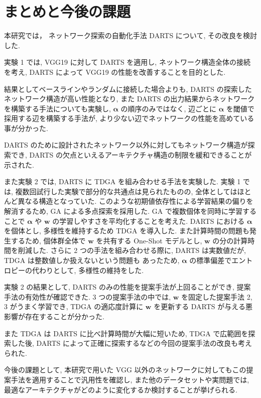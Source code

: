 \newpage
\changeindent{0cm}
\section{まとめと今後の課題}
\label{sec:conclusion}
\changeindent{2cm}

本研究では，
ネットワーク探索の自動化手法 DARTS について, その改良を検討した.

実験 1 では,
VGG19 に対して DARTS を適用し, ネットワーク構造全体の接続を考え,
DARTS によって VGG19 の性能を改善することを目的とした.

結果としてベースラインやランダムに接続した場合よりも,
DARTS の探索したネットワーク構造が高い性能となり,
また DARTS の出力結果からネットワークを構築する手法についても実験し,
$\bm{\alpha}$ の順序のみではなく, 辺ごとに $\bm{\alpha}$ を閾値で採用する辺を構築する手法が,
より少ない辺でネットワークの性能を高めている事が分かった.

DARTS のために設計されたネットワーク以外に対してもネットワーク構造が探索でき,
DARTS の欠点といえるアーキテクチャ構造の制限を緩和できることが示された.

また実験 2 では,
DARTS に TDGA を組み合わせる手法を実験した.
実験 1 では, 複数回試行した実験で部分的な共通点は見られたものの,
全体としてはほとんど異なる構造となっていた.
このような初期値依存性による学習結果の偏りを解消するため,
GA による多点探索を採用した.
GA で複数個体を同時に学習することで $\bm{\alpha}$ や $\bm{w}$ の学習しやすさを平均化することを考えた.
DARTS における $\bm{\alpha}$ を個体とし, 多様性を維持するため TDGA を導入した.
また計算時間の問題も発生するため, 個体群全体で $\bm{w}$ を共有する One-Shot モデルとし,
$\bm{w}$ の分の計算時間を削減した.
さらに 2 つの手法を組み合わせる際に, DARTS は実数値だが, TDGA は整数値しか扱えないという問題も
あったため, $\bm{\alpha}$ の標準偏差でエントロピーの代わりとして, 多様性の維持をした.

実験 2 の結果として, DARTS のみの性能を提案手法が上回ることができ, 提案手法の有効性が確認できた.
3 つの提案手法の中では, $\bm{w}$ を固定した提案手法 2, 3 がうまく学習でき,
TDGA の適応度計算に $\bm{w}$ を更新する DARTS が与える悪影響が存在することが分かった.

また TDGA は DARTS に比べ計算時間が大幅に短いため,
TDGA で広範囲を探索した後, DARTS によって正確に探索するなどの今回の提案手法の改良も考えられた.


今後の課題として,
本研究で用いた VGG 以外のネットワークに対してもこの提案手法を適用することで汎用性を確認し,
また他のデータセットや実問題では, 最適なアーキテクチャがどのように変化するか検討することが挙げられる.
